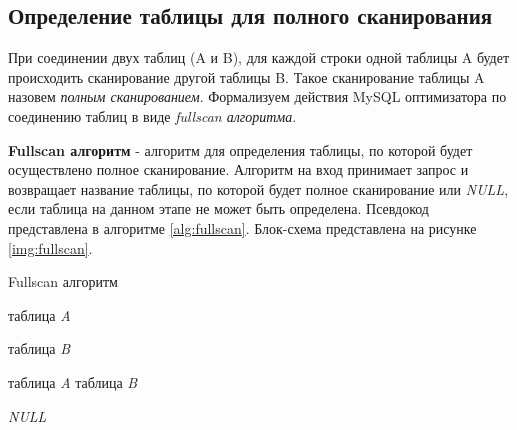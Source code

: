 \subsection{Определение таблицы для полного сканирования}

При соединении двух таблиц (A и B), для каждой строки одной таблицы A будет происходить сканирование другой таблицы B. Такое сканирование таблицы A назовем \textit{полным сканированием}. Формализуем действия MySQL оптимизатора \cite[p.~217]{zaitsev} по соединению таблиц в виде \textit{fullscan алгоритма}.

\textbf{Fullscan алгоритм} - алгоритм для определения таблицы, по которой будет осуществлено полное сканирование. Алгоритм на вход принимает запрос и возвращает название таблицы, по которой будет полное сканирование или \textit{NULL}, если таблица на данном этапе не может быть определена. Псевдокод представлена в алгоритме \ref{alg:fullscan}. Блок-схема представлена на рисунке \ref{img:fullscan}.

\begin{algorithm}[h!]
\caption{Fullscan алгоритм}
\label{alg:fullscan}
\begin{algorithmic}[1]
 
        \Else
            \State \Return таблица \textit{A}
        \EndIf
    \EndIf
    \Statex 
    
        \Else
            \State \Return таблица \textit{B}
        \EndIf
    \EndIf
    \Statex 

            \State \Return таблица \textit{A}
            \State \Return таблица \textit{B}
        \EndIf
    \EndIf
    \Statex 

    \State \Return \textit{NULL}
\EndFunction
 
\end{algorithmic}
\end{algorithm}

